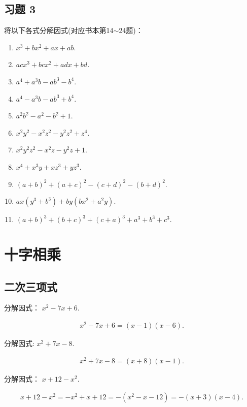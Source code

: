 \subsection*{习题 3}
将以下各式分解因式(对应书本第14$\sim$24题)：
\begin{enumerate}
	\item $ x^{3}+b x^{2}+a x+a b$.
	\item $ a c x^{3}+b c x^{2}+a d x+b d$.
	\item $ a^{4}+a^{3} b-a b^{3}-b^{4}$.
	\item $ a^{4}-a^{3} b-a b^{3}+b^{4}$.
	\item $ a^{2} b^{2}-a^{2}-b^{2}+1$.
	\item $ x^{2} y^{2}-x^{2} z^{2}-y^{2} z^{2}+z^{4}$.
	\item $ x^{2} y^{2} z^{2}-x^{2} z-y^{2} z+1$.
	\item $ x^{4}+x^{3} y+x z^{3}+y z^{3}$.
	\item $(a+b)^{2}+(a+c)^{2}-(c+d)^{2}-(b+d)^{2}$.
	\item $ a x\left(y^{3}+b^{3}\right)+b y\left(b x^{2}+a^{2} y\right)$.
	\item $(a+b)^{3}+(b+c)^{3}+(c+a)^{3}+a^{3}+b^{3}+c^{3}$.
\end{enumerate}

\section{十字相乘}
\subsection{二次三项式}
\begin{example}
	分解因式： $x^{2}-7 x+6.$
\end{example}
\begin{solution}
	\begin{align*}
		x^{2}-7 x+6=(x-1)(x-6) .
	\end{align*}
\end{solution}

\begin{example}
	分解因式: $x^{2}+7 x-8$.
\end{example}
\begin{solution}
	\begin{align*}
		x^{2}+7 x-8=(x+8)(x-1).
	\end{align*}
\end{solution}

\begin{example}
	分解因式： $x+12-x^{2}$.
\end{example}
\begin{solution}
	\begin{align*}
		x+12-x^{2}=-x^{2}+x+12=-\left(x^{2}-x-12\right)=-(x+3)(x-4).
	\end{align*}
\end{solution}

